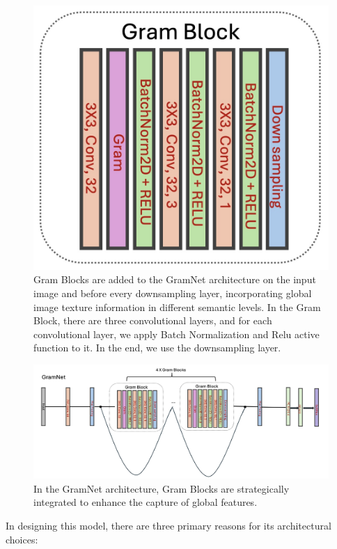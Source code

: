 \documentclass[rebuttal]{cvpr}
\begin{document}
\begin{figure}[t]
\begin{center}
   \includegraphics[width=0.8\linewidth]{images/GramBlock.jpg}
\end{center}
   \caption{Gram Blocks are added to the GramNet architecture on the input image and before every downsampling layer, incorporating global image texture information in different semantic levels. In the Gram Block, there are three convolutional layers, and for each convolutional layer, we apply Batch Normalization and Relu active function to it. In the end, we use the downsampling layer.}
\label{fig:long}
\label{fig:gramblock}
\end{figure}

\begin{figure}[t]
\begin{center}
   \includegraphics[width=0.8\linewidth]{images/GramNet.jpg}
\end{center}
   \caption{In the GramNet architecture, Gram Blocks are strategically integrated to enhance the capture of global features.}
\label{fig:long}
\label{fig:gramnet}
\end{figure}

In designing this model, there are three primary reasons for its architectural choices:  
\end{document}
